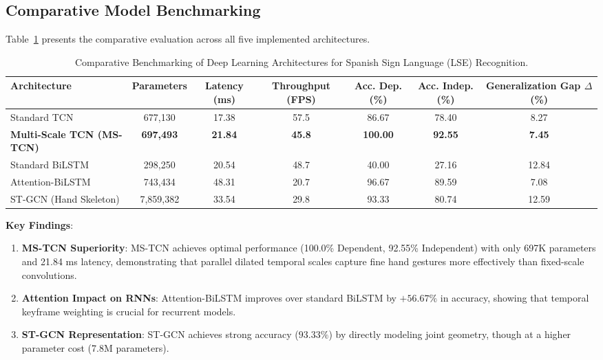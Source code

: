 \documentclass[journal,compsoc]{IEEEtran}
\begin{document}
\subsection{Comparative Model Benchmarking}
Table~\ref{tab:benchmark} presents the comparative evaluation across all five implemented architectures.

\begin{table}[t]
\centering
\caption{Comparative Benchmarking of Deep Learning Architectures for Spanish Sign Language (LSE) Recognition.}
\label{tab:benchmark}
\begin{tabular}{lcccccc}
\toprule
\textbf{Architecture} & \textbf{Parameters} & \textbf{Latency (ms)} & \textbf{Throughput (FPS)} & \textbf{Acc. Dep. (\%)} & \textbf{Acc. Indep. (\%)} & \textbf{Generalization Gap $\Delta$ (\%)} \\
\midrule
Standard TCN & 677,130 & 17.38 & 57.5 & 86.67 & 78.40 & 8.27 \\
\textbf{Multi-Scale TCN (MS-TCN)} & \textbf{697,493} & \textbf{21.84} & \textbf{45.8} & \textbf{100.00} & \textbf{92.55} & \textbf{7.45} \\
Standard BiLSTM & 298,250 & 20.54 & 48.7 & 40.00 & 27.16 & 12.84 \\
Attention-BiLSTM & 743,434 & 48.31 & 20.7 & 96.67 & 89.59 & 7.08 \\
ST-GCN (Hand Skeleton) & 7,859,382 & 33.54 & 29.8 & 93.33 & 80.74 & 12.59 \\
\bottomrule
\end{tabular}
\end{table}

\textbf{Key Findings}:
\begin{enumerate}
    \item \textbf{MS-TCN Superiority}: MS-TCN achieves optimal performance (100.0\% Dependent, 92.55\% Independent) with only 697K parameters and 21.84 ms latency, demonstrating that parallel dilated temporal scales capture fine hand gestures more effectively than fixed-scale convolutions.
    \item \textbf{Attention Impact on RNNs}: Attention-BiLSTM improves over standard BiLSTM by $+56.67\%$ in accuracy, showing that temporal keyframe weighting is crucial for recurrent models.
    \item \textbf{ST-GCN Representation}: ST-GCN achieves strong accuracy ($93.33\%$) by directly modeling joint geometry, though at a higher parameter cost (7.8M parameters).
\end{enumerate}
\end{document}
